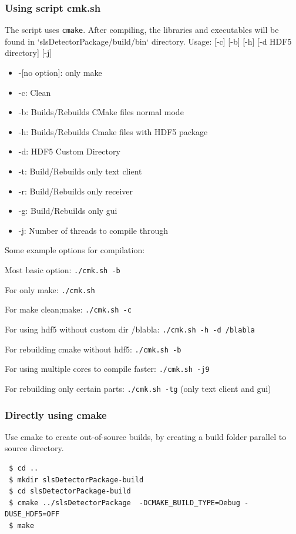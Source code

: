 \documentclass{article}
\begin{document}
\subsubsection{Using script cmk.sh}
The script uses \verb=cmake=. After compiling, the libraries and executables
will be found in `slsDetectorPackage/build/bin` directory.
Usage: [-c] [-b] [-h] [-d HDF5 directory] [-j]
\begin{itemize}
 \item -[no option]: only make
 \item -c: Clean
 \item -b: Builds/Rebuilds CMake files normal mode
 \item -h: Builds/Rebuilds Cmake files with HDF5 package
 \item -d: HDF5 Custom Directory
 \item -t: Build/Rebuilds only text client
 \item -r: Build/Rebuilds only receiver
 \item -g: Build/Rebuilds only gui
 \item -j: Number of threads to compile through
\end{itemize}

Some example options for compilation:

Most basic option: \verb=./cmk.sh -b=

For only make: \verb=./cmk.sh=

For make clean;make: \verb=./cmk.sh -c=

For using hdf5 without custom dir /blabla: \verb=./cmk.sh -h -d /blabla=

For rebuilding cmake without hdf5: \verb=./cmk.sh -b=

For using multiple cores to compile faster: \verb=./cmk.sh -j9=

For rebuilding only certain parts: \verb=./cmk.sh -tg= (only text client and
gui)


\subsubsection{Directly using cmake}

Use cmake to create out-of-source builds, by creating a build folder parallel to
source directory. 
\begin{verbatim}
 $ cd ..
 $ mkdir slsDetectorPackage-build
 $ cd slsDetectorPackage-build
 $ cmake ../slsDetectorPackage  -DCMAKE_BUILD_TYPE=Debug -DUSE_HDF5=OFF 
 $ make
\end{verbatim}
\end{document}
